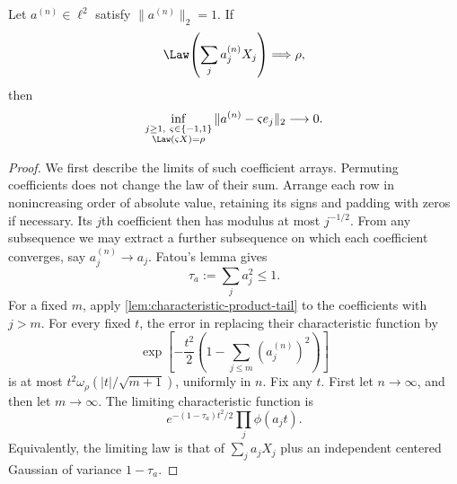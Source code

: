 \begin{lemma}
\label{lem:unit-row-rigidity}
Let $a^{(n)}\in\ell^2$ satisfy $\|a^{(n)}\|_2=1$.  If
\[
 \Law\!\left(\sum_j a_j^{(n)}X_j\right)
       \Longrightarrow\rho,
\]
then
\begin{equation}
 \inf_{\substack{j\geq1,\ \varsigma\in\{-1,1\}\\
                  \Law(\varsigma X)=\rho}}
       \|a^{(n)}-\varsigma e_j\|_2\longrightarrow0.
 \label{eq:unit-row-qualitative}
\end{equation}
\end{lemma}
\begin{proof}
We first describe the limits of such coefficient arrays.  Permuting
coefficients does not change the law of their sum.  Arrange each row in
nonincreasing order of absolute value, retaining its signs and padding
with zeros if necessary.  Its $j$th coefficient then has modulus at most
$j^{-1/2}$.  From any subsequence we may extract a further subsequence
on which each coefficient converges, say $a_j^{(n)}\to a_j$.
Fatou's lemma gives
\[
 \tau_a:=\sum_j a_j^2\leq1.
\]
For a fixed $m$, apply
\cref{lem:characteristic-product-tail} to the coefficients with
$j>m$.  For every fixed $t$, the error in replacing their characteristic
function by
\[
 \exp\!\left[-\frac{t^2}{2}
        \left(1-\sum_{j\leq m}(a_j^{(n)})^2\right)\right]
\]
is at most
$t^2\omega_\rho(|t|/\sqrt{m+1})$, uniformly in $n$.
Fix any $t$.
First let $n\to\infty$, and then let $m\to\infty$.
The limiting characteristic function is
\begin{equation}
 e^{-(1-\tau_a)t^2/2}\prod_j\phi(a_jt).
 \label{eq:unit-row-gaussian-summand}
\end{equation}
Equivalently, the limiting law is that of $\sum_j a_jX_j$ plus an
independent centered Gaussian of variance $1-\tau_a$.


\end{proof}
